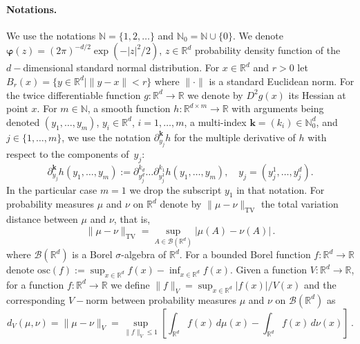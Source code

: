 \documentclass[bj]{imsart}
\def\nset{\mathbb{N}}
\def\rset{\mathbb{R}}
\def\rset{\mathbb{R}}
\newcommand{\tvnorm}[1]{\| #1 \|_{\operatorname{TV}}}
\def\eqsp{\,}
\begin{document}
\paragraph{Notations. }\label{par:notations}
We use the notations $\nset=\{1,2,\ldots\}$ and $\nset_0=\mathbb N\cup\{0\}$. We denote $\boldsymbol{\varphi}(z)=(2\pi)^{-d/2} \exp(-|z|^2/2)$, $z\in\mathbb R^d$ probability density function of the $d-$dimensional standard normal distribution. For $x \in \rset^d$ and $r>0$ let $B_r(x) = \{y \in \rset^d | \|y - x\| < r\}$ where $\|\cdot\|$ is a standard Euclidean norm. For the twice differentiable function $g: \rset^d \rightarrow \rset$ we denote by $D^2g(x)$ its Hessian at point $x$. For $m\in\mathbb N$, a smooth function
$h\colon\mathbb R^{d\times m}\to\mathbb R$
with arguments being denoted
$(y_1,\ldots,y_m)$, $y_i\in\mathbb R^d$, $i=1,\ldots,m$,
a multi-index $\mathbf k=(k_i)\in\mathbb N_0^d$,
and $j\in\{1,\ldots,m\}$,
we use the notation $\partial^{\mathbf k}_{y_j} h$ for the multiple derivative of $h$
with respect to the components of~$y_j$:
\[
\partial^{\mathbf k}_{y_j} h(y_1,\ldots,y_m)
:=\partial^{k_d}_{y_j^d}
\ldots
\partial^{k_1}_{y_j^1}
h(y_1,\ldots,y_m),
\quad y_j=(y_j^1,\ldots,y_j^d).
\]
In the particular case $m=1$ we drop the subscript $y_1$ in that notation. For probability measures $\mu$ and $\nu$ on $\rset^d$ denote by $\tvnorm{\mu-\nu}$ the total variation distance between $\mu$ and $\nu$, that is,
\[
\tvnorm{\mu-\nu}=\sup_{A \in \mathcal{B}(\rset^d)}
|\mu(A)-\nu(A)| \eqsp.
\]
where $\mathcal{B}(\rset^d)$ is a Borel $\sigma$-algebra of $\rset^d$. For a bounded Borel function $f: \rset^d \rightarrow \rset$ denote $\mathrm{osc}(f):=\sup_{x\in\mathbb R^d}f(x)-\inf_{x\in\mathbb R^d}f(x)$. Given a function $V: \rset^d \rightarrow \rset$, for a function $f: \rset^d \rightarrow \rset$ we define $\|f\|_{V} = \sup_{x \in \rset^d} |f(x)|/V(x)$ and the corresponding $V-$norm between probability measures $\mu$ and $\nu$ on $\mathcal{B}(\rset^d)$ as
\[
d_V(\mu, \nu) = \|\mu - \nu\|_{V} = \sup_{\|f\|_{V} \leq 1} \left[\int\nolimits_{\rset^d}f(x)\,d\mu(x) - \int\nolimits_{\rset^d}f(x)\,d\nu(x)\right]  \eqsp.
\]
\end{document}
